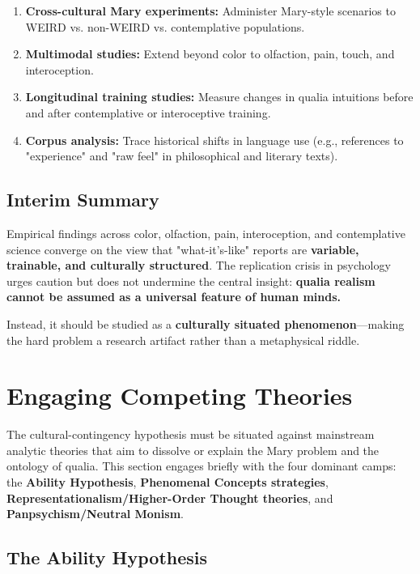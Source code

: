 \documentclass[11pt,a4paper]{article}
\begin{document}
\begin{enumerate}
\item \textbf{Cross-cultural Mary experiments:} Administer Mary-style scenarios to WEIRD vs. non-WEIRD vs. contemplative populations.
\item \textbf{Multimodal studies:} Extend beyond color to olfaction, pain, touch, and interoception.
\item \textbf{Longitudinal training studies:} Measure changes in qualia intuitions before and after contemplative or interoceptive training.
\item \textbf{Corpus analysis:} Trace historical shifts in language use (e.g., references to "experience" and "raw feel" in philosophical and literary texts).
\end{enumerate}

\subsection{Interim Summary}

Empirical findings across color, olfaction, pain, interoception, and contemplative science converge on the view that "what-it's-like" reports are \textbf{variable, trainable, and culturally structured}. The replication crisis in psychology urges caution but does not undermine the central insight: \textbf{qualia realism cannot be assumed as a universal feature of human minds.}

Instead, it should be studied as a \textbf{culturally situated phenomenon}—making the hard problem a research artifact rather than a metaphysical riddle.

\section{Engaging Competing Theories}

The cultural-contingency hypothesis must be situated against mainstream analytic theories that aim to dissolve or explain the Mary problem and the ontology of qualia. This section engages briefly with the four dominant camps: the \textbf{Ability Hypothesis}, \textbf{Phenomenal Concepts strategies}, \textbf{Representationalism/Higher-Order Thought theories}, and \textbf{Panpsychism/Neutral Monism}.

\subsection{The Ability Hypothesis}
\end{document}
